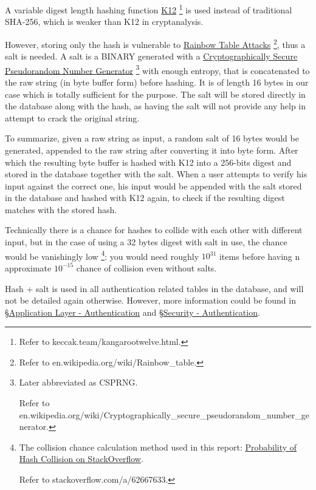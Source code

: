 \documentclass[12pt]{report}
\newcommand{\n}{\par}
\begin{document}
\begin{itemize}
	      A variable digest length hashing function
	      \href{https://keccak.team/kangarootwelve.html}{K12}
	      \footnote{Refer to keccak.team/kangarootwelve.html.}
	      is used instead of traditional SHA-256, which is weaker than K12 in cryptanalysis.\n
	      However, storing only the hash is vulnerable to
	      \href{https://en.wikipedia.org/wiki/Rainbow_table}{Rainbow Table Attacks}
	      \footnote{Refer to en.wikipedia.org\-/wiki/Rainbow\_table.},
	      thus a salt is needed. A salt is a BINARY generated with a
	      \href{https://en.wikipedia.org/wiki/Cryptographically_secure_pseudorandom_number_generator}{Cryptographically Secure Pseudorandom Number Generator}
	      \footnote{Later abbreviated as CSPRNG.\n
		      Refer to en.wikipedia.org/wiki/Cryptographically\_secure\_pseudorandom\_number\_generator.}
	      with enough entropy, that is concatenated to the raw string (in byte buffer form) before hashing.
	      It is of length 16 bytes in our case which is totally sufficient for the purpose.
	      The salt will be stored directly in the database along with the hash,
	      as having the salt will not provide any help in attempt to crack the original string.\n
	      To summarize, given a raw string as input, a random salt of 16 bytes would be generated,
	      appended to the raw string after converting it into byte form.
	      After which the resulting byte buffer is hashed with K12 into a 256-bits digest and stored in the database together with the salt.
	      When a user attempts to verify his input against the correct one,
	      his input would be appended with the salt stored in the database and hashed with K12 again,
	      to check if the resulting digest matches with the stored hash.\n
	      Technically there is a chance for hashes to collide with each other with different input,
	      but in the case of using a 32 bytes digest with salt in use, the chance would be vanishingly low
	      \footnote{The collision chance calculation method used in this report: \href{https://stackoverflow.com/a/62667633}{Probability of Hash Collision on StackOverflow}.\n
		      Refer to stackoverflow.com/a/62667633.}:
	      you would need roughly $10^{31}$ items before having n approximate $10^{-15}$ chance of collision even without salts.\n
	      Hash + salt is used in all authentication related tables in the database, and will not be detailed again otherwise.
	      However, more information could be found in
	      \S \hyperref[application-layer.implementation.authentication]{Application Layer - Authentication} and
	      \S \hyperref[security.authentication]{Security - Authentication}.
\end{itemize}
\end{document}
